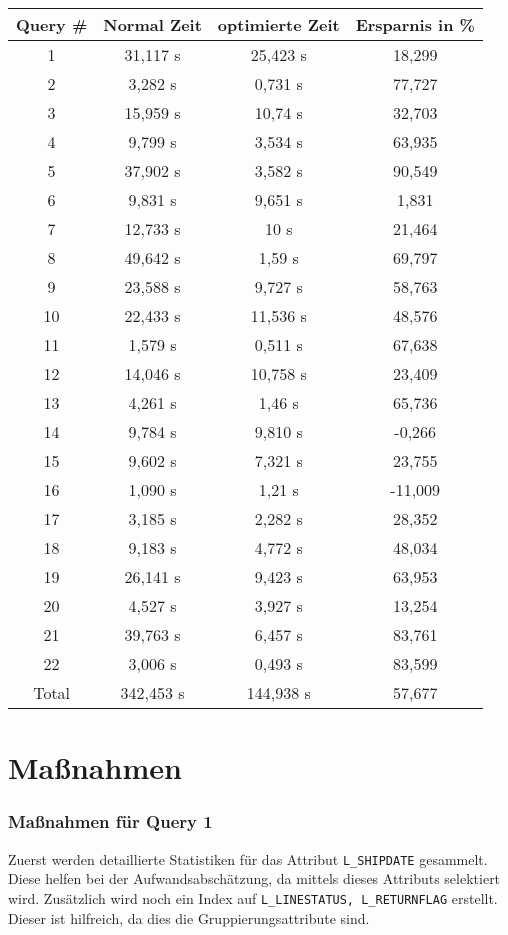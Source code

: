 \documentclass[12pt]{article}
\begin{document}
\begin{tabular}{c|cc|c}
Query \# & Normal Zeit & optimierte Zeit & Ersparnis in \%	\\
\hline
1	&	31,117 s	&	25,423 s&	18,299\\
2	& 	3,282 s	    &	0,731 s	&	77,727\\
3	&	15,959 s	&	10,74 s	&	32,703\\
4	&	9,799 s	    &	3,534 s	&	63,935\\
5	&	37,902 s	&	3,582 s	&	90,549\\
6	&	9,831 s	    &	9,651 s	&	1,831\\
7	&	12,733 s	&	10 s	&	21,464\\
8	&	49,642 s	&	1,59 s	&	69,797\\
9	&	23,588 s	&	9,727 s	&	58,763\\
10	&	22,433 s	& 	11,536 s&	48,576\\
11	&	1,579 s	    &	0,511 s	&	67,638\\
12	&	14,046 s	&	10,758 s&	23,409\\
13	&	4,261 s	    &	1,46 s	&	65,736\\
14	&	9,784 s	    &	9,810 s	&	-0,266\\
15	&	9,602 s	    &	7,321 s	&	23,755\\
16	&	1,090 s	    &	1,21 s	&	-11,009\\
17	&	3,185 s	    &	2,282 s	&	28,352\\
18	&	9,183 s	    &	4,772 s	&	48,034\\
19	&	26,141 s	&	9,423 s	&	63,953\\
20	&	4,527 s	    &	3,927 s	&	13,254\\
21	&	39,763 s	&	6,457 s	&	83,761\\
22	&	3,006 s	    &	0,493 s	&	83,599\\
\hline
Total&	342,453 s	&	144,938 s	&	57,677\\
\end{tabular}

\newpage
\section*{Maßnahmen}

\subsubsection*{Maßnahmen für Query 1}
Zuerst werden detaillierte Statistiken für das Attribut \verb=L_SHIPDATE=
gesammelt. Diese helfen bei der Aufwandsabschätzung, da mittels dieses Attributs
selektiert wird. Zusätzlich wird noch ein Index auf \verb=L_LINESTATUS, L_RETURNFLAG= erstellt. Dieser ist hilfreich, da dies die Gruppierungsattribute
sind.
\end{document}
